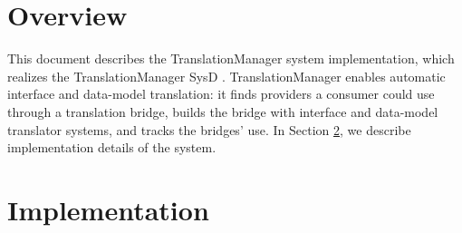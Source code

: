 \documentclass[a4paper]{arrowhead}
\begin{document}
\sloppy

\ArrowheadSetup

\begin{center}
  \vspace*{1cm}
  \huge{\arrowtitle}

  \vspace*{0.2cm}
  \LARGE{\arrowtype}
  \vspace*{1cm}

  \vspace*{\fill}


  \vspace*{1cm}
  \vspace*{\fill}

  \begin{abstract}
    This document describes the design and implementation of the TranslationManager support system of Arrowhead 5.2.2 (\texttt{ah5-TranslationManager-java-spring}).
  \end{abstract}

  \vspace*{1cm}
\end{center}

\newpage

\tableofcontents
\newpage

\section{Overview}
\label{sec:overview}

This document describes the TranslationManager system implementation, which realizes the TranslationManager SysD \cite{tm-sysd}. Translation\allowbreak{}Manager enables automatic interface and data-model translation: it finds providers a consumer could use through a translation bridge, builds the bridge with interface and data-model translator systems, and tracks the bridges' use.
In Section \ref{Implementation}, we describe implementation details of the system.

\newpage

\section{Implementation}
\label{Implementation}
\end{document}
